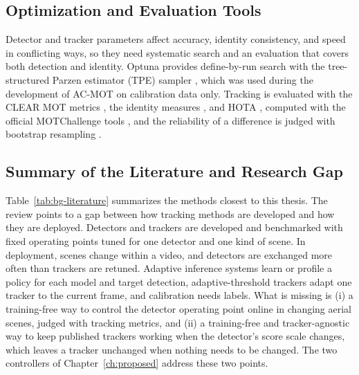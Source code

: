 \subsection{Optimization and Evaluation Tools}
Detector and tracker parameters affect accuracy, identity consistency, and speed in conflicting ways, so they need systematic search and an evaluation that covers both detection and identity. Optuna provides define-by-run search with the tree-structured Parzen estimator (TPE) sampler \cite{akiba2019optuna}, which was used during the development of AC-MOT on calibration data only. Tracking is evaluated with the CLEAR MOT metrics \cite{bernardin2008clear}, the identity measures \cite{ristani2016idf1}, and HOTA \cite{luiten2021hota}, computed with the official MOTChallenge tools \cite{dendorfer2021motchallenge}, and the reliability of a difference is judged with bootstrap resampling \cite{efron2016casi}.

\subsection{Summary of the Literature and Research Gap}\label{sec:bg-gap}
Table~\ref{tab:bg-literature} summarizes the methods closest to this thesis. The review points to a gap between how tracking methods are developed and how they are deployed. Detectors and trackers are developed and benchmarked with fixed operating points tuned for one detector and one kind of scene. In deployment, scenes change within a video, and detectors are exchanged more often than trackers are retuned. Adaptive inference systems learn or profile a policy for each model and target detection, adaptive-threshold trackers adapt one tracker to the current frame, and calibration needs labels. What is missing is (i) a training-free way to control the detector operating point online in changing aerial scenes, judged with tracking metrics, and (ii) a training-free and tracker-agnostic way to keep published trackers working when the detector's score scale changes, which leaves a tracker unchanged when nothing needs to be changed. The two controllers of Chapter~\ref{ch:proposed} address these two points.


